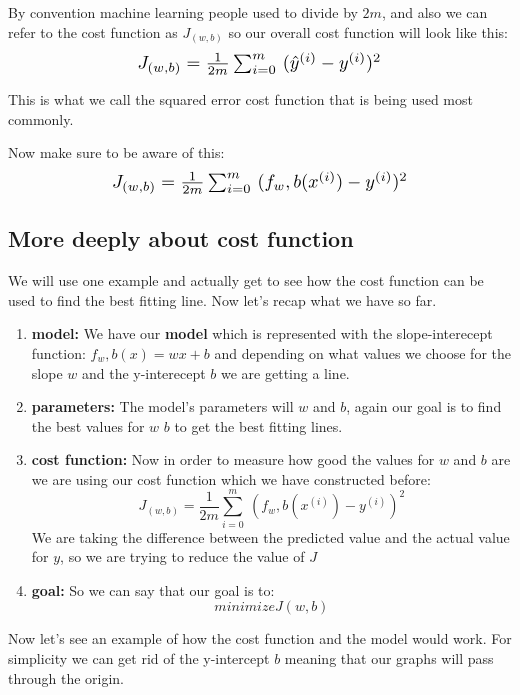By convention machine learning people used to divide by $2m$, and also we can refer to the cost function as $J_(w,b)$ so our overall cost function will look like this:
\begin{align*}
    \scalebox{1.3}{$
    J_{(w,b)}=\frac{1}{2m}\sum_{i=0}^{m}\ (\hat{y}^{(i)}-y^{(i)})^2
  $}
\end{align*}

This is what we call the squared error cost function that is being used most commonly.

Now make sure to be aware of this: 
\begin{align*}
    \scalebox{1.3}{$
    J_{(w,b)}=\frac{1}{2m}\sum_{i=0}^{m}\ (f_w,b(x^{(i)})-y^{(i)})^2
  $}
\end{align*}

\subsection{More deeply about cost function}
We will use one example and actually get to see how the cost function can be used to find the best fitting line.
Now let's recap what we have so far.
\begin{enumerate}
  \item \textbf{model:} We have our \textbf{model} which is represented with the slope-interecept function: $f_w,b(x)=wx+b$ and depending on what values we choose for the slope $w$ and the y-interecept $b$ we are getting a line.
  \item  \textbf{parameters:} The model's parameters will $w$ and $b$, again our goal is to find the best values for $w$ $b$ to get the best fitting lines.
  \item \textbf{cost function:} Now in order to measure how good the values for $w$ and $b$ are we are using our cost function which we have constructed before: $$ J_{(w,b)}=\frac{1}{2m}\sum_{i=0}^{m}\ (f_w,b(x^{(i)})-y^{(i)})^2 $$ 
  We are taking the difference between the predicted value and the actual value for $y$, so we are trying to reduce the value of $J$
  \item \textbf{goal: } So we can say that our goal is to: $$ minimize J(w,b)$$
\end{enumerate}

Now let's see an example of how the cost function and the model would work. 
For simplicity we can get rid of the y-intercept $b$ meaning that our graphs will pass through the origin. 

